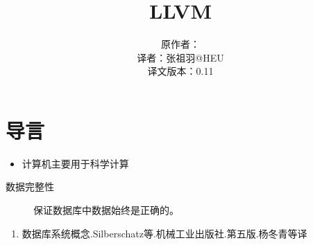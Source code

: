 \documentclass[12pt,a4paper]{article}
\title{LLVM}
\author{原作者：\\译者：张祖羽@HEU\\译文版本：0.11}
\begin{document}
\maketitle

\section{导言}

\begin{itemize}
\item 计算机主要用于科学计算
\end{itemize}

\begin{description}
\item[数据完整性] 保证数据库中数据始终是正确的。
\end{description}

\begin{enumerate}
\item 数据库系统概念.Silberschatz等.机械工业出版社.第五版.杨冬青等译
\end{enumerate}
\end{document}
